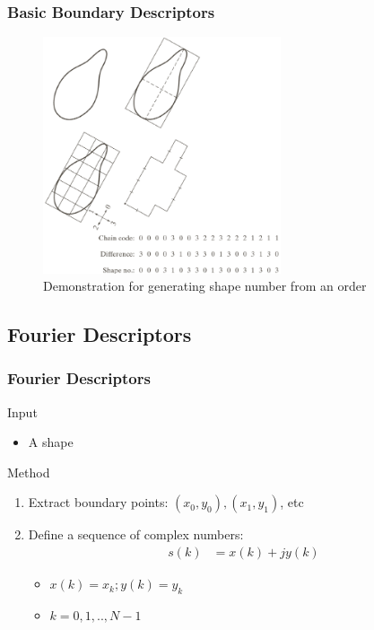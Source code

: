 \documentclass[english,11pt,table,handout]{beamer}
\begin{document}
\frame
{
	\frametitle{Basic Boundary Descriptors}
	
	\begin{figure}[!h]
		\includegraphics[width=7cm]{shape_number2.png}
		\caption{Demonstration for generating shape number from an order}
	\end{figure}
}

\subsection{Fourier Descriptors}
\frame
{
	\frametitle{Fourier Descriptors}
	\begin{block}{Input}
		\begin{itemize}
			\item A shape
		\end{itemize}
	\end{block}
	
	\begin{block}{Method}
		\begin{enumerate}
			\item Extract boundary points: $(x_0, y_0), (x_1, y_1)$, etc
			\item Define a sequence of complex numbers:
			\begin{equation}
				\begin{split}
					\nonumber
					s(k) &= x(k) + jy(k)
				\end{split}
			\end{equation}
			\begin{itemize}
				\item $x(k) = x_k; y(k) = y_k$
				\item $k = 0, 1, .., N-1$
				
			\end{itemize}
		\end{enumerate}
	\end{block}
}
\end{document}
